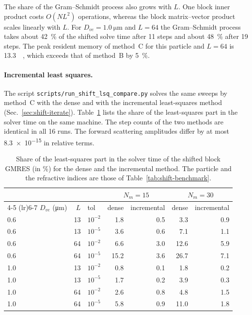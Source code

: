 \documentclass[11pt,a4paper]{article}
\begin{document}
The share of the Gram--Schmidt process also grows with $L$.
One block inner product costs $O(N L^2)$ operations, whereas the block
matrix--vector product scales linearly with $L$.
For $D_{ve} = \SI{1.0}{\micro\meter}$ and $L = 64$ the Gram--Schmidt
process takes about \SI{42}{\percent} of the shifted solve time
after 11 steps and about \SI{48}{\percent} after 19 steps.
The peak resident memory of method~C for this particle and $L = 64$ is
\SI{13.3}{\gibi\byte}, which exceeds that of method~B by
\SI{5}{\percent}.

\paragraph{Incremental least squares.}
The script \texttt{scripts/run\_shift\_lsq\_compare.py} solves the same
sweeps by method~C with the dense and with the incremental
least-squares method (Sec.~\ref{sec:shift-iterate}).
Table~\ref{tab:shift-lsq} lists the share of the least-squares part in
the solver time on the same machine.
The step counts of the two methods are identical in all 16 runs.
The forward scattering amplitudes differ by at most \num{8.3e-15} in
relative terms.

\begin{table}[htbp]
  \centering
  \caption{Share of the least-squares part in the solver time of the
           shifted block GMRES (in \si{\percent}) for the dense and
           the incremental method.
           The particle and the refractive indices are those of
           Table~\ref{tab:shift-benchmark}.}
  \label{tab:shift-lsq}
  \begin{tabular}{lrlrrrr}
    \toprule
    & & & \multicolumn{2}{c}{$N_m = 15$}
        & \multicolumn{2}{c}{$N_m = 30$} \\
    \cmidrule(lr){4-5} \cmidrule(lr){6-7}
    $D_{ve}$ (\si{\micro\meter}) & $L$ & tol
      & dense & incremental & dense & incremental \\
    \midrule
    0.6 & 13 & $10^{-2}$ &  1.8 & 0.5 &  3.3 & 0.9 \\
    0.6 & 13 & $10^{-5}$ &  3.6 & 0.6 &  7.1 & 1.1 \\
    0.6 & 64 & $10^{-2}$ &  6.6 & 3.0 & 12.6 & 5.9 \\
    0.6 & 64 & $10^{-5}$ & 15.2 & 3.6 & 26.7 & 7.1 \\
    1.0 & 13 & $10^{-2}$ &  0.8 & 0.1 &  1.8 & 0.2 \\
    1.0 & 13 & $10^{-5}$ &  1.7 & 0.2 &  3.9 & 0.3 \\
    1.0 & 64 & $10^{-2}$ &  2.6 & 0.8 &  4.8 & 1.5 \\
    1.0 & 64 & $10^{-5}$ &  5.8 & 0.9 & 11.0 & 1.8 \\
    \bottomrule
  \end{tabular}
\end{table}
\end{document}

